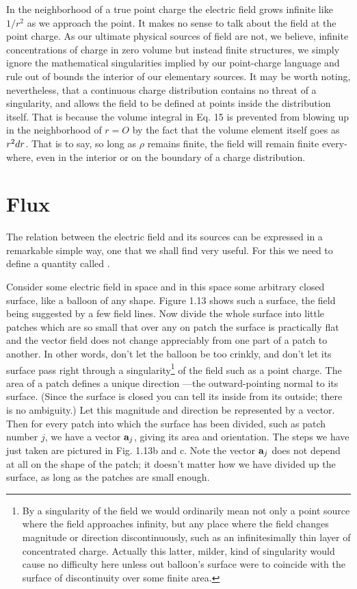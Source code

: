 In the neighborhood of a true point charge the electric field grows
infinite like $1/r^2$ as we approach the point. It makes no sense to talk
about the field at the point charge. As our ultimate physical sources
of field are not, we believe, infinite concentrations of charge in zero
volume but instead finite structures, we simply ignore the mathematical
singularities implied by our point-charge language and rule
out of bounds the interior of our elementary sources. It may be
worth noting, nevertheless, that a continuous charge distribution
contains no threat of a singularity, and allows the field to be defined
at points inside the distribution itself. That is because the volume
integral in Eq. 15 is prevented from blowing up in the neighborhood
of $r = O$ by the fact that the volume element itself goes as $r^2 d r$. That
is to say, so long as $\rho$ remains finite, the field will remain finite every-
where, even in the interior or on the boundary of a charge
distribution.


\section{Flux}

The relation between the electric field and its sources can be
expressed in a remarkable simple way, one that we shall find very
useful. For this we need to define a quantity called .

Consider some electric field in space and in this space some
arbitrary closed surface, like a balloon of any shape. Figure 1.13
shows such a surface, the field being suggested by a few field lines.
Now divide the whole surface into little patches which are so small
that over any on patch the surface is practically flat and the vector
field does not change appreciably from one part of a patch to
another. In other words, don't let the balloon be too crinkly, and
don't let its surface pass right through a singularity\footnote{By a
singularity of the field we would ordinarily mean not only a point
source where the field approaches infinity, but any place where the
field changes magnitude or direction discontinuously, such as an
infinitesimally thin layer of concentrated charge.
Actually this latter, milder, kind of singularity would cause no
difficulty here unless out balloon's surface were to coincide with
the surface of discontinuity over some finite area.} of the field
such as a point charge. The area of a patch defines a unique
direction ---the outward-pointing normal to its surface. (Since the
surface is closed you can tell its inside from its outside; there is
no ambiguity.) Let this magnitude and direction be represented by a
vector. Then for every patch into which the surface has been divided,
such as patch number $j$, we have a vector $\mathbf{a}_j$, giving its area
and orientation. The steps we have just taken are pictured in Fig.
1.13b and c. Note the vector $\mathbf{a}_j$ does not depend at all on
the shape of the patch; it doesn't matter how we have divided up the
surface, as long as the patches are small enough.

